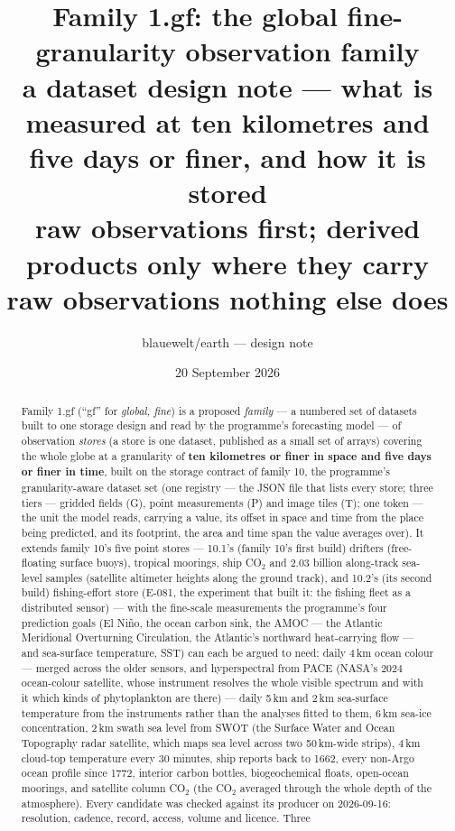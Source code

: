 \documentclass[10pt]{article}
\title{Family 1.gf: the global fine-granularity observation family\\
a dataset design note --- what is measured at ten kilometres and five days or finer, and how it is stored\\
\large raw observations first; derived products only where they carry raw observations nothing else does}
\author{blauewelt/earth --- design note}
\date{20 September 2026}
\begin{document}
\maketitle

\begin{abstract}
Family 1.gf (``gf'' for \emph{global, fine}) is a proposed \emph{family} --- a numbered set of datasets built to one storage design and read by the programme's forecasting model --- of observation \emph{stores} (a store is one dataset, published as a small set of arrays) covering the whole
globe at a granularity of \textbf{ten kilometres or finer in space and five
days or finer in time}, built on the storage contract of family 10, the programme's granularity-aware dataset set (one
registry --- the JSON file that lists every store; three tiers --- gridded fields (G), point measurements (P) and image tiles (T); one token --- the unit the model reads, carrying a value, its offset in space and time from the place being predicted, and its footprint, the area and time span the value averages over). It
extends family 10's five point stores --- 10.1's (family 10's first build) drifters (free-floating surface buoys), tropical moorings,
ship CO$_2$ and 2.03 billion along-track sea-level samples (satellite altimeter heights along the ground track), and 10.2's (its second build)
fishing-effort store (E-081, the experiment that built it: the fishing fleet as a distributed sensor) --- with the fine-scale
measurements the programme's four prediction goals (El Ni\~no, the ocean
carbon sink, the AMOC --- the Atlantic Meridional Overturning Circulation, the Atlantic's northward heat-carrying flow --- and sea-surface temperature, SST) can each be argued to
need: daily 4\,km ocean colour --- merged across the older sensors, and
hyperspectral from PACE (NASA's 2024 ocean-colour satellite, whose
instrument resolves the whole visible spectrum and with it which kinds of
phytoplankton are there) --- daily 5\,km and 2\,km sea-surface temperature
from the instruments rather than the analyses fitted to them, 6\,km sea-ice
concentration, 2\,km swath sea level from SWOT (the Surface Water and Ocean Topography radar satellite, which maps sea level across two 50\,km-wide strips), 4\,km cloud-top temperature
every 30 minutes, ship reports back to 1662, every non-Argo ocean profile since
1772, interior carbon bottles, biogeochemical floats, open-ocean moorings, and
satellite column CO$_2$ (the CO$_2$ averaged through the whole depth of the atmosphere). Every candidate was checked against its producer on
2026-09-16: resolution, cadence, record, access, volume and licence. Three

\end{abstract}
\end{document}
